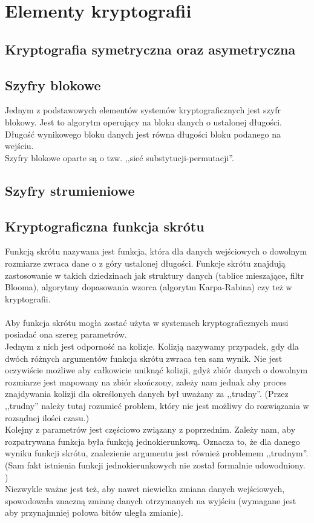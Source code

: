 \chapter{Elementy kryptografii}

\section{Kryptografia symetryczna oraz asymetryczna}
\section{Szyfry blokowe}
Jednym z podstawowych elementów systemów kryptograficznych jest szyfr blokowy. Jest to algorytm operujący na bloku danych o ustalonej długości. Długość wynikowego bloku danych jest równa długości bloku podanego na wejściu. \\
Szyfry blokowe oparte są o tzw. ,,sieć substytucji-permutacji''. 

\section{Szyfry strumieniowe}
\section{Kryptograficzna funkcja skrótu}
Funkcją skrótu nazywana jest funkcja, która dla danych wejściowych o dowolnym rozmiarze zwraca dane o z góry ustalonej długości. Funkcje skrótu znajdują zastosowanie w takich dziedzinach jak struktury danych (tablice mieszające, filtr Blooma), algorytmy dopasowania wzorca (algorytm Karpa-Rabina) czy też w kryptografii. \\ \\
Aby funkcja skrótu mogła zostać użyta w systemach kryptograficznych musi posiadać ona szereg parametrów. \\
Jednym z nich jest odporność na kolizje. Kolizją nazywamy przypadek, gdy dla dwóch różnych argumentów funkcja skrótu zwraca ten sam wynik. Nie jest oczywiście możliwe aby całkowicie uniknąć kolizji, gdyż zbiór danych o dowolnym rozmiarze jest mapowany na zbiór skończony, zależy nam jednak aby proces znajdywania kolizji dla określonych danych był uważany za ,,trudny''. (Przez ,,trudny'' należy tutaj rozumieć problem, który nie jest możliwy do rozwiązania w rozsądnej ilości czasu.) \\
Kolejny z parametrów jest częściowo związany z poprzednim. Zależy nam, aby rozpatrywana funkcja była funkcją jednokierunkową. Oznacza to, że dla danego wyniku funkcji skrótu, znalezienie argumentu jest również problemem ,,trudnym''.
(Sam fakt istnienia funkcji jednokierunkowych nie został formalnie udowodniony. \cite{oneway}) \\
Niezwykle ważne jest też, aby nawet niewielka zmiana danych wejściowych, spowodowała znaczną zmianę danych otrzymanych na wyjściu (wymagane jest aby przynajmniej połowa bitów uległa zmianie).

